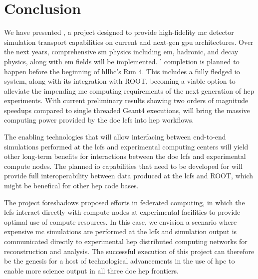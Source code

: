 \section{Conclusion}

We have presented \celeritas, a project designed to provide high-fidelity
\ac{mc} detector simulation transport capabilities on current and next-gen
\ac{gpu} architectures. Over the next years, comprehensive \ac{sm} physics
including \ac{em}, hadronic, and decay physics, along with \ac{em} fields will
be implemented. \celeritas' completion is planned to happen before the beginning
of \acs{hllhc}'s Run 4. This includes a fully fledged \ac{io} system, along with
its integration with ROOT, becoming a viable option to alleviate the impending
\ac{mc} computing requirements of the next generation of \ac{hep} experiments.
{\color{red}With current preliminary results showing two orders of magnitude
speedups compared to single threaded Geant4 executions}, \celeritas will bring
the massive computing power provided by the \ac{doe} \acp{lcf} into \ac{hep}
workflows.

The enabling technologies that will allow interfacing between end-to-end
simulations performed at the \acp{lcf} and experimental computing centers will
yield other long-term benefits for interactions between the \ac{doe} \acp{lcf}
and experimental compute nodes. The planned \ac{io} capabilities that need to be
developed for \celeritas will provide full interoperability between data
produced at the \acp{lcf} and ROOT, which might be benefical for other \ac{hep}
code bases.

The \celeritas project foreshadows proposed efforts in federated computing, in
which the \acp{lcf} interact directly with compute nodes at experimental
facilities to provide optimal use of compute resources.  In this case, we
envision a scenario where expensive \ac{mc} simulations are performed at the
\acp{lcf} and simulation output is communicated directly to experimental
\ac{hep} distributed computing networks for reconstruction and analysis.  The
successful execution of this project can therefore be the genesis for a host of
technological advancements in the use of \ac{hpc} to enable more science output
in all three \ac{doe} \ac{hep} frontiers.
